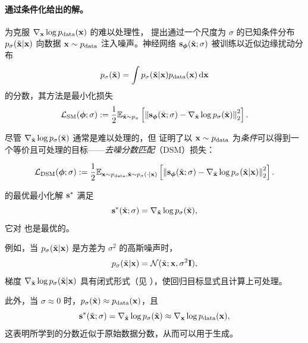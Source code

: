 \paragraph{\citet{vincent2011connection} 通过条件化给出的解。}
为克服 $\nabla_{{\mathbf{x}}} \log p_{\text{data}}({\mathbf{x}})$ 的难以处理性，\citet{vincent2011connection} 提出通过一个尺度为 $\sigma$ 的已知条件分布 $p_{\sigma}(\tilde{{\mathbf{x}}}|{\mathbf{x}})$ 向数据 ${\mathbf{x}} \sim p_{\text{data}}$ 注入噪声。神经网络 ${\mathbf{s}}_{\bm{\phi}}(\tilde{{\mathbf{x}}}; \sigma)$ 被训练以近似边缘扰动分布
\[
p_\sigma(\tilde{{\mathbf{x}}}) = \int p_{\sigma}(\tilde{{\mathbf{x}}}|{\mathbf{x}}) p_{\text{data}}({\mathbf{x}}) \mathop{}\!\mathrm{d} {\mathbf{x}}
\]
的分数，其方法是最小化损失
\begin{align}\label{eq:sm-noise-loss}
\mathcal{L}_{\text{SM}}(\bm{\phi}; \sigma) := \frac{1}{2} \mathbb{E}_{\tilde{{\mathbf{x}}} \sim p_\sigma} \left[ \left\lVert{\mathbf{s}}_{\bm{\phi}}(\tilde{{\mathbf{x}}}; \sigma) - \nabla_{\tilde{{\mathbf{x}}}} \log p_\sigma(\tilde{{\mathbf{x}}})\right\rVert_2^2 \right].
\end{align}

尽管 $\nabla_{\tilde{{\mathbf{x}}}} \log p_\sigma(\tilde{{\mathbf{x}}})$ 通常是难以处理的，但 \citet{vincent2011connection} 证明了以 ${\mathbf{x}} \sim p_{\text{data}}$ 为\emph{条件}可以得到一个等价且可处理的目标——\emph{去噪分数匹配}（DSM）损失：
\begin{mdframed}
\begin{align}\label{eq:dsm-loss}
\mathcal{L}_{\text{DSM}}(\bm{\phi}; \sigma) := \frac{1}{2} \mathbb{E}_{{\mathbf{x}} \sim p_{\text{data}}, \tilde{{\mathbf{x}}} \sim p_{\sigma}(\cdot|{\mathbf{x}})} \left[ \left\lVert{\mathbf{s}}_{\bm{\phi}}(\tilde{{\mathbf{x}}}; \sigma) - \nabla_{\tilde{{\mathbf{x}}}} \log p_{\sigma}(\tilde{{\mathbf{x}}}|{\mathbf{x}})\right\rVert_2^2 \right].
\end{align}
\end{mdframed}

 的最优最小化解 ${\mathbf{s}}^*$ 满足
\[
{\mathbf{s}}^*(\tilde{{\mathbf{x}}}; \sigma) = \nabla_{\tilde{{\mathbf{x}}}} \log p_\sigma(\tilde{{\mathbf{x}}}),
\]
它对  也是最优的。

例如，当 $p_{\sigma}(\tilde{{\mathbf{x}}}|{\mathbf{x}})$ 是方差为 $\sigma^2$ 的高斯噪声时，
\[
p_{\sigma}(\tilde{{\mathbf{x}}}|{\mathbf{x}}) = \mathcal{N}(\tilde{{\mathbf{x}}}; {\mathbf{x}}, \sigma^2 \mathbf{I}),
\]
梯度 $\nabla_{\tilde{{\mathbf{x}}}} \log p_{\sigma}(\tilde{{\mathbf{x}}}|{\mathbf{x}})$ 具有闭式形式（见 ），使回归目标显式且计算上可处理。

此外，当 $\sigma \approx 0$ 时，$p_\sigma(\tilde{{\mathbf{x}}}) \approx p_{\text{data}}({\mathbf{x}})$，且
\[
{\mathbf{s}}^*(\tilde{{\mathbf{x}}}; \sigma) = \nabla_{\tilde{{\mathbf{x}}}} \log p_\sigma(\tilde{{\mathbf{x}}}) \approx \nabla_{{\mathbf{x}}} \log p_{\text{data}}({\mathbf{x}}),
\]
这表明所学到的分数近似于原始数据分数，从而可以用于生成。

